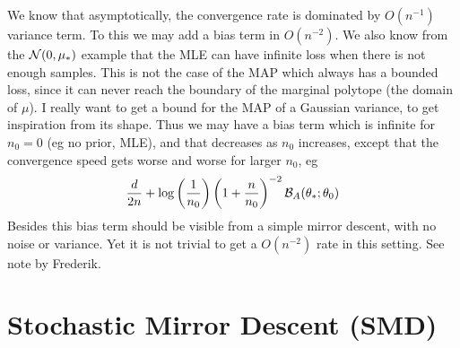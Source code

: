 \documentclass{article}
\newcommand{\logpart}{A}
\newcommand{\bregman}{\cB_\logpart}
\newcommand{\natp}{\theta}
\begin{document}
We know that asymptotically, the convergence rate is dominated by $O(n^{-1})$ variance term. To this we may add a bias term in $O(n^{-2})$. 
We also know from the ${\mathcal N}(0,\mu_*)$ example that the MLE can have infinite loss when there is not enough samples. This is not the case of the MAP which always has a bounded loss, since it can never reach the boundary of the marginal polytope (the domain of $\mu$). 
I really want to get a bound for the MAP of a Gaussian variance, to get inspiration from its shape. 
Thus we may have a bias term which is infinite for $n_0=0$ (eg no prior, MLE), and that decreases as $n_0$ increases, except that the convergence speed gets worse and worse for larger $n_0$, eg
\begin{align}
    \frac{d}{2n} +  \log \left (\inv{n_0} \right) \left(1+ \frac{n}{n_0} \right)^{-2} \bregman(\natp_*; \natp_0)
\end{align}
Besides this bias term should be visible from a simple mirror descent, with no noise or variance. Yet it is not trivial to get a $O(n^{-2})$ rate in this setting. See note by Frederik.

\section{Stochastic Mirror Descent (SMD)}
\end{document}

